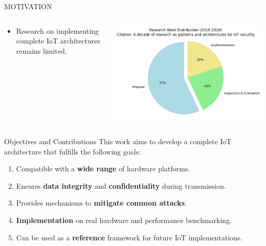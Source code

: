 \begin{frame}{MOTIVATION}
    \begin{columns}
        \begin{column}{0.45\textwidth}
            \begin{itemize}
                \item Research on implementing complete IoT architectures remains limited.
            \end{itemize}
        \end{column}
        \begin{column}{0.55\textwidth}
            \centering
            \includegraphics[width=1\linewidth]{pic/research2.png}
        \end{column}
    \end{columns}
\end{frame}

\begin{frame}{Objectives and Contributions}
This work aims to develop a complete IoT architecture that fulfills the following goals:
\begin{enumerate}
    \item Compatible with a \textbf{wide range} of hardware platforms.
    \item Ensures \textbf{data integrity} and \textbf{confidentiality} during transmission.
    \item Provides mechanisms to \textbf{mitigate common attacks}.
    \item \textbf{Implementation} on real hardware and performance benchmarking.
    \item Can be used as a \textbf{reference} framework for future IoT implementations.
\end{enumerate}
\end{frame}
